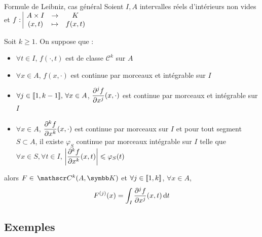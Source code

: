 \begin{theoreme}{Formule de Leibniz, cas général}{}
    Soient $I, A$ intervalles réels d'intérieurs non vides et $f: \space \begin{array}{|ccc} \displaystyle A \times I & \to & \displaystyle K \\ \displaystyle (x, t) & \mapsto & \displaystyle f(x, t) \end{array}$ 

    Soit $k \geqslant 1$. On suppose que : 
    \begin{itemize}
        \item $\forall t \in I$, $f(\cdot, t)$ est de classe $\mathscr C^k$ sur $A$
        \item $\forall x \in A$, $f(x, \cdot)$ est continue par morceaux et intégrable sur $I$
        \item $\forall j \in [\![1, k - 1]\!], \, \forall x \in A$, $\displaystyle \frac{\partial^j f}{\partial x^j}(x, \cdot)$ est continue 
        par morceaux et intégrable sur $I$
        \item $\forall x \in A$, $\displaystyle \frac{\partial^k f }{\partial x^k}(x, \cdot)$ est continue par morceaux 
        sur $I$ et pour tout segment $S \subset A$, il existe $\varphi_S$ continue par morceaux intégrable sur 
        $I$ telle que $\forall x \in S, \forall t \in I$, $\displaystyle \left| \frac{\partial^k f }{\partial x^k}(x, t) \right| \leqslant \varphi_S(t)$
    \end{itemize}

    \svspace alors $F \in \mc k (A, \K)$ et $\forall j \in [\![1, k]\!]$, $\forall x \in A$, 
    $$F^{(j)}(x) = \int_I \frac{\partial^j f}{\partial x^j}(x, t) \,\mathrm{d}t$$
\end{theoreme}

\subsection{Exemples }

